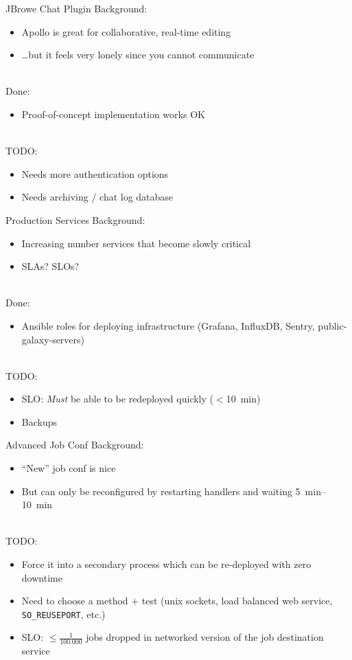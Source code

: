 \documentclass[12pt]{ufrslides}
\begin{document}
	\begin{frame}{JBrowe Chat Plugin}
		Background:
		\begin{itemize}
			\item Apollo is great for collaborative, real-time editing
			\item \ldots{}but it feels very lonely since you cannot communicate
		\end{itemize}
		\ \\[0.5cm]
		Done:
		\begin{itemize}
			\item Proof-of-concept implementation works OK
		\end{itemize}
		\ \\[0.5cm]
		TODO:
		\begin{itemize}
			\item Needs more authentication options
			\item Needs archiving / chat log database
		\end{itemize}
	\end{frame}

	\begin{frame}{Production Services}
		Background:
		\begin{itemize}
			\item Increasing number services that become slowly critical
			\item SLAs? SLOs?
		\end{itemize}
		\ \\[0.5cm]
		Done:
		\begin{itemize}
			\item Ansible roles for deploying infrastructure (Grafana, InfluxDB, Sentry, public-galaxy-servers)
		\end{itemize}
		\ \\[0.5cm]
		TODO:
		\begin{itemize}
			\item SLO: \emph{Must} be able to be redeployed quickly ($<$\SI{10}{\minute})
			\item Backups
		\end{itemize}
	\end{frame}

	\begin{frame}{Advanced Job Conf}
		Background:
		\begin{itemize}
			\item ``New'' job conf is nice
			\item But can only be reconfigured by restarting handlers and waiting \SIrange{5}{10}{\minute}
		\end{itemize}
		\ \\[0.5cm]
		TODO:
		\begin{itemize}
			\item Force it into a secondary process which can be re-deployed with zero downtime
			\item Need to choose a method + test  (unix sockets, load balanced web service, \texttt{SO\_REUSEPORT}, etc.)
			\item SLO: $\leq\frac{1}{100.000}$ jobs dropped in networked version of the job destination service
		\end{itemize}
	\end{frame}
\end{document}
